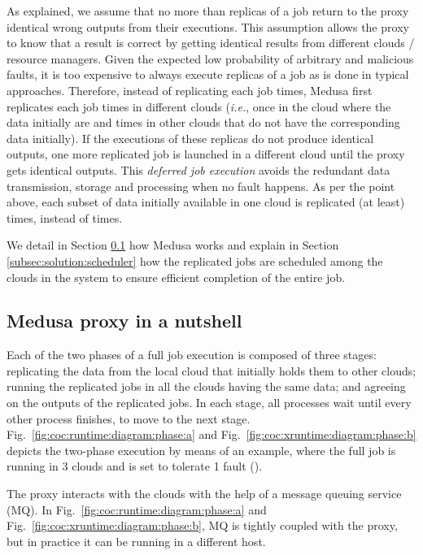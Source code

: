 \documentclass[10pt, conference, compsocconf]{IEEEtran}
\begin{document}
As explained, we assume that no more than  replicas of a job return to the proxy identical wrong outputs from their executions. This assumption allows the proxy to know that a result is correct by getting  identical results from different clouds / resource managers.
Given the expected low probability of arbitrary and malicious faults, it is too expensive to always execute  replicas of a job as is done in typical approaches.
Therefore, instead of replicating each job  times, Medusa first replicates each job  times in
 different clouds (\textit{i.e.}, once in the cloud where the data initially are and  times in other clouds that do not have the corresponding data initially). If the executions of these replicas do not produce identical outputs, one more replicated job is launched in a different cloud until the proxy gets  identical outputs. This \emph{deferred job execution} avoids the redundant data transmission, storage and processing when no fault happens.
As per the point above, each subset of data initially available in one cloud is replicated (at least)  times, instead of  times.

We detail in Section \ref{subsec:solution:example} how Medusa works and explain in Section \ref{subsec:solution:scheduler} how the replicated jobs are scheduled among the clouds in the system to ensure efficient completion of the entire job.

\subsection{Medusa proxy in a nutshell}
\label{subsec:solution:example}

Each of the two phases of a full job execution is composed of three stages: replicating the data from the local cloud that initially holds them to other clouds; running the replicated jobs in all the clouds having the same data; and agreeing on the outputs of the replicated jobs. In each stage, all processes wait until every other process finishes, to move to the next stage. Fig.~\ref{fig:coc:runtime:diagram:phase:a} and Fig.~\ref{fig:coc:xruntime:diagram:phase:b} depicts the two-phase execution by means of an example, where the full job is running in 3 clouds and is set to tolerate 1 fault ().

The proxy interacts with the clouds with the help of a message queuing service (MQ).
In Fig.~\ref{fig:coc:runtime:diagram:phase:a} and Fig.~\ref{fig:coc:xruntime:diagram:phase:b}, MQ is tightly coupled with the proxy, but in practice it can be running in a different host.
\end{document}
